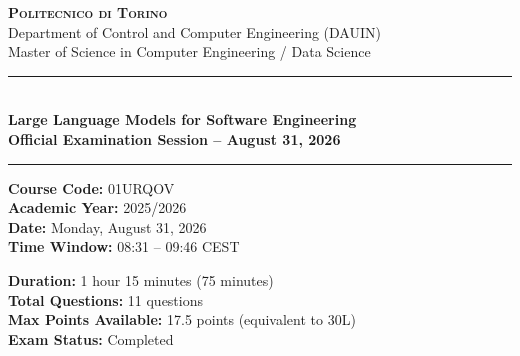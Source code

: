 \documentclass[11pt,a4paper]{article}
\begin{document}
\begin{center}
    {\Large\textbf{\textsc{Politecnico di Torino}}}\\[3pt]
    {\large Department of Control and Computer Engineering (DAUIN)}\\[2pt]
    {\large Master of Science in Computer Engineering / Data Science}\\[6pt]
    \rule{\textwidth}{1.2pt}\\[6pt]
    {\LARGE\textbf{Large Language Models for Software Engineering}}\\[4pt]
    {\Large\textbf{Official Examination Session -- August 31, 2026}}\\[6pt]
    \rule{\textwidth}{1.2pt}
\end{center}

\vspace{0.2cm}

\noindent
\begin{minipage}[t]{0.48\textwidth}
    \textbf{Course Code:} 01URQOV\\
    \textbf{Academic Year:} 2025/2026\\
    \textbf{Date:} Monday, August 31, 2026\\
    \textbf{Time Window:} 08:31 -- 09:46 CEST
\end{minipage}
\hfill
\begin{minipage}[t]{0.48\textwidth}
    \textbf{Duration:} 1 hour 15 minutes (75 minutes)\\
    \textbf{Total Questions:} 11 questions\\
    \textbf{Max Points Available:} 17.5 points (equivalent to 30L)\\
    \textbf{Exam Status:} Completed
\end{minipage}

\vspace{0.4cm}
\end{document}
